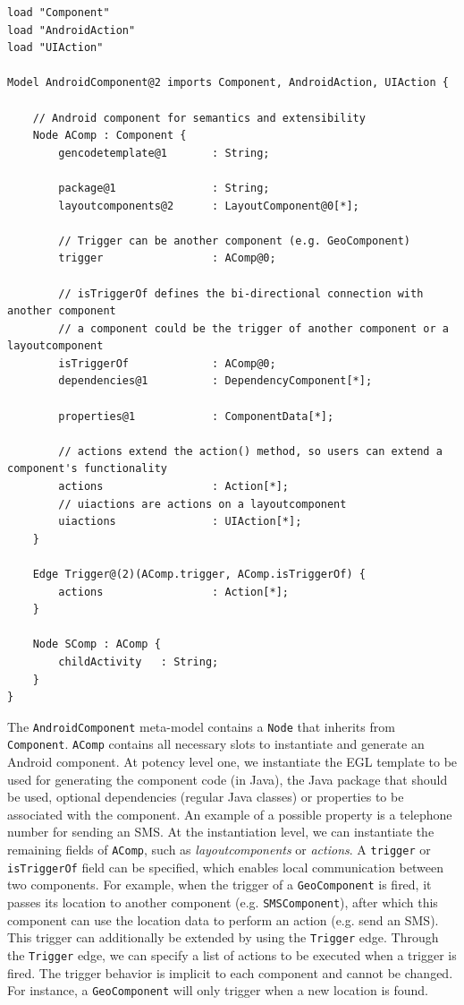 \begin{lstlisting}[label=androidcomponent-mm,caption=AndroidComponent meta-model, captionpos=t]
load "Component"
load "AndroidAction"
load "UIAction"

Model AndroidComponent@2 imports Component, AndroidAction, UIAction {

	// Android component for semantics and extensibility
	Node AComp : Component {
		gencodetemplate@1 		: String;

		package@1 				: String;
		layoutcomponents@2 		: LayoutComponent@0[*];

		// Trigger can be another component (e.g. GeoComponent)
		trigger 				: AComp@0;

		// isTriggerOf defines the bi-directional connection with another component
		// a component could be the trigger of another component or a layoutcomponent
		isTriggerOf 			: AComp@0;
		dependencies@1 			: DependencyComponent[*];

		properties@1 			: ComponentData[*];
		
		// actions extend the action() method, so users can extend a component's functionality
		actions 				: Action[*];
		// uiactions are actions on a layoutcomponent
		uiactions 				: UIAction[*];
	}

	Edge Trigger@(2)(AComp.trigger, AComp.isTriggerOf) {
		actions 				: Action[*];
	}

	Node SComp : AComp {
		childActivity	: String;
	}
}
\end{lstlisting}
The \texttt{AndroidComponent} meta-model contains a \texttt{Node} that inherits from \texttt{Component}. \texttt{AComp} contains all necessary slots to instantiate and generate an Android component. At potency level one, we instantiate the EGL template to be used for generating the component code (in Java), the Java package that should be used, optional dependencies (regular Java classes) or properties to be associated with the component. An example of a possible property is a telephone number for sending an SMS. At the instantiation level, we can instantiate the remaining fields of \texttt{AComp}, such as \textit{layoutcomponents} or \textit{actions}. A \texttt{trigger} or \texttt{isTriggerOf} field can be specified, which enables local communication between two components. For example, when the trigger of a \texttt{GeoComponent} is fired, it passes its location to another component (e.g. \texttt{SMSComponent}), after which this component can use the location data to perform an action (e.g. send an SMS). This trigger can additionally be extended by using the \texttt{Trigger} edge. Through the \texttt{Trigger} edge, we can specify a list of actions to be executed when a trigger is fired. The trigger behavior is implicit to each component and cannot be changed. For instance, a \texttt{GeoComponent} will only trigger when a new location is found. \\ \\
